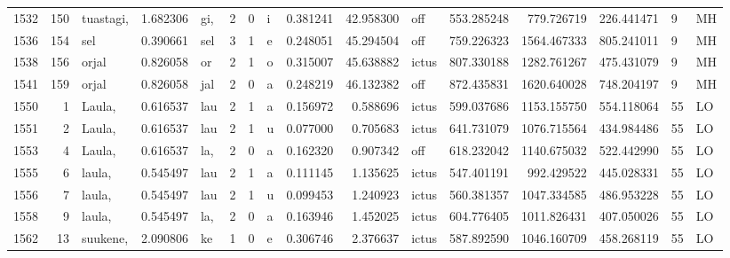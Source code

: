 \begin{tabular}{lrlrllllrrlrrrll}
1532 &         150 &        tuastagi, &  1.682306 &     gi, &        2 &      0 &       i &      0.381241 &     42.958300 &    off &   553.285248 &   779.726719 &   226.441471 &      9 &        MH \\
1536 &         154 &              sel &  0.390661 &     sel &        3 &      1 &       e &      0.248051 &     45.294504 &    off &   759.226323 &  1564.467333 &   805.241011 &      9 &        MH \\
1538 &         156 &            orjal &  0.826058 &      or &        2 &      1 &       o &      0.315007 &     45.638882 &  ictus &   807.330188 &  1282.761267 &   475.431079 &      9 &        MH \\
1541 &         159 &            orjal &  0.826058 &     jal &        2 &      0 &       a &      0.248219 &     46.132382 &    off &   872.435831 &  1620.640028 &   748.204197 &      9 &        MH \\
1550 &           1 &           Laula, &  0.616537 &     lau &        2 &      1 &       a &      0.156972 &      0.588696 &  ictus &   599.037686 &  1153.155750 &   554.118064 &     55 &        LO \\
1551 &           2 &           Laula, &  0.616537 &     lau &        2 &      1 &       u &      0.077000 &      0.705683 &  ictus &   641.731079 &  1076.715564 &   434.984486 &     55 &        LO \\
1553 &           4 &           Laula, &  0.616537 &     la, &        2 &      0 &       a &      0.162320 &      0.907342 &    off &   618.232042 &  1140.675032 &   522.442990 &     55 &        LO \\
1555 &           6 &           laula, &  0.545497 &     lau &        2 &      1 &       a &      0.111145 &      1.135625 &  ictus &   547.401191 &   992.429522 &   445.028331 &     55 &        LO \\
1556 &           7 &           laula, &  0.545497 &     lau &        2 &      1 &       u &      0.099453 &      1.240923 &  ictus &   560.381357 &  1047.334585 &   486.953228 &     55 &        LO \\
1558 &           9 &           laula, &  0.545497 &     la, &        2 &      0 &       a &      0.163946 &      1.452025 &  ictus &   604.776405 &  1011.826431 &   407.050026 &     55 &        LO \\
1562 &          13 &         suukene, &  2.090806 &      ke &        1 &      0 &       e &      0.306746 &      2.376637 &  ictus &   587.892590 &  1046.160709 &   458.268119 &     55 &        LO \\

\end{tabular}
